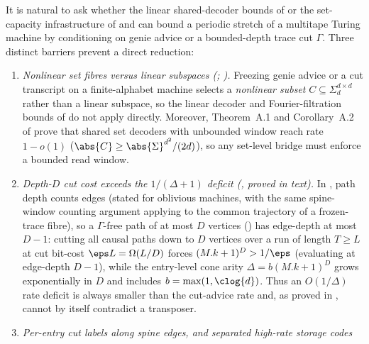 \begin{remark}\label{rem:sweep-negative}
It is natural to ask whether the linear shared-decoder bounds of
 or the set-capacity infrastructure
of  and  can bound a periodic stretch of a
multitape Turing machine by conditioning on genie advice or a bounded-depth trace cut $\Gamma$. Three
distinct barriers prevent a direct reduction:
\begin{enumerate}[label=(\arabic*)]
\item \emph{Nonlinear set fibres versus linear subspaces
  (\cite[Problem~9.4(b)]{SeventeenthPaper2026}; \cite[Theorem~A.1 and Corollary~A.2]{SharedDecoders2026}).}
  Freezing genie advice or a cut transcript on a finite-alphabet machine selects a \emph{nonlinear
  subset} $C \subseteq \Sigma_d^{d\times d}$ rather than a linear subspace, so the linear decoder and
  Fourier-filtration bounds of  do
  not apply directly. Moreover, Theorem~A.1 and Corollary~A.2 of \cite{SharedDecoders2026} prove that
  shared set decoders with unbounded window reach rate $1 - o(1)$ ($\abs{C} \ge \abs{\Sigma}^{d^2}/(2d)$),
  so any set-level bridge must enforce a bounded read window.
\item \emph{Depth-$D$ cut cost exceeds the $1/(\Delta+1)$ deficit
  (\cite[Propositions~4.13 and~4.14(c)]{FourthPaper2026}, proved in text).}
  In \cite[Propositions~4.13 and~4.14(c)]{FourthPaper2026}, path depth counts edges (stated for
  oblivious machines, with the same spine-window counting argument applying to the common trajectory of
  a frozen-trace fibre), so a $\Gamma$-free path of at most $D$ vertices () has
  edge-depth at most $D - 1$: cutting all causal paths down to $D$ vertices over a run of length $T \ge L$
  at cut bit-cost $\eps L = \Omega(L/D)$ forces $(M.k + 1)^D > 1/\eps$ (evaluating
  \cite[Proposition~4.14(c)]{FourthPaper2026} at edge-depth $D - 1$), while the entry-level cone arity
  $\Delta = b(M.k + 1)^D$ grows exponentially in $D$ and includes $b = \max(1, \clog{d})$. Thus an
  $O(1/\Delta)$ rate deficit is always smaller than the cut-advice rate and, as proved in
  \cite[Proposition~4.14(c)]{FourthPaper2026}, cannot by itself contradict a transposer.
\item \emph{Per-entry cut labels along spine edges, and separated high-rate storage codes
}
\end{enumerate}
\end{remark}
